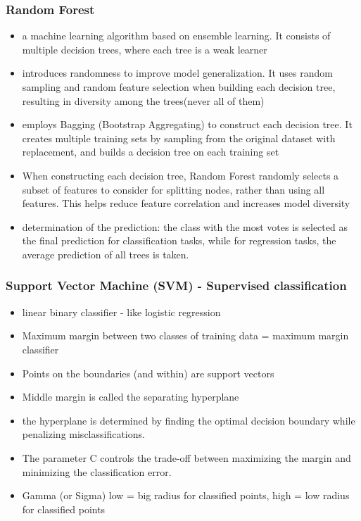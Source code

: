 \documentclass[
  letterpaper,
  DIV=11,
  numbers=noendperiod]{scrreprt}
\providecommand{\tightlist}{%
  \setlength{\itemsep}{0pt}\setlength{\parskip}{0pt}}\usepackage{longtable,booktabs,array}
\begin{document}
\hypertarget{random-forest}{%
\subsubsection{Random Forest}\label{random-forest}}

\begin{itemize}
\tightlist
\item
  a machine learning algorithm based on ensemble learning. It consists
  of multiple decision trees, where each tree is a weak learner
\item
  introduces randomness to improve model generalization. It uses random
  sampling and random feature selection when building each decision
  tree, resulting in diversity among the trees(never all of them)
\item
  employs Bagging (Bootstrap Aggregating) to construct each decision
  tree. It creates multiple training sets by sampling from the original
  dataset with replacement, and builds a decision tree on each training
  set
\item
  When constructing each decision tree, Random Forest randomly selects a
  subset of features to consider for splitting nodes, rather than using
  all features. This helps reduce feature correlation and increases
  model diversity
\item
  determination of the prediction: the class with the most votes is
  selected as the final prediction for classification tasks, while for
  regression tasks, the average prediction of all trees is taken.
\end{itemize}

\hypertarget{support-vector-machine-svm---supervised-classification}{%
\subsubsection{Support Vector Machine (SVM) - Supervised
classification}\label{support-vector-machine-svm---supervised-classification}}

\begin{itemize}
\tightlist
\item
  linear binary classifier - like logistic regression
\item
  Maximum margin between two classes of training data = maximum margin
  classifier
\item
  Points on the boundaries (and within) are support vectors
\item
  Middle margin is called the separating hyperplane
\item
  the hyperplane is determined by finding the optimal decision boundary
  while penalizing misclassifications.
\item
  The parameter C controls the trade-off between maximizing the margin
  and minimizing the classification error.
\item
  Gamma (or Sigma) low = big radius for classified points, high = low
  radius for classified points
\end{itemize}
\end{document}
